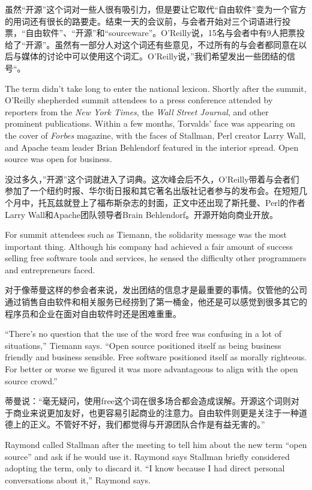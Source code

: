 \ifdefined\chs
虽然“开源”这个词对一些人很有吸引力，但是要让它取代“自由软件”变为一个官方的用词还有很长的路要走。结束一天的会议前，与会者开始对三个词语进行投票，“自由软件”、“开源”和“sourceware”。O'Reilly说，15名与会者中有9人把票投给了“开源”。虽然有一部分人对这个词还有些意见，不过所有的与会者都同意在以后与媒体的讨论中可以使用这个词汇。O'Reilly说，”我们希望发出一些团结的信号“。
\fi

\ifdefined\eng
The term didn't take long to enter the national lexicon. Shortly after the summit, O'Reilly shepherded summit attendees to a press conference attended by reporters from the \textit{New York Times}, the \textit{Wall Street Journal}, and other prominent publications. Within a few months, Torvalds' face was appearing on the cover of \textit{Forbes} magazine, with the faces of Stallman, Perl creator Larry Wall, and Apache team leader Brian Behlendorf featured in the interior spread. Open source was open for business.
\fi

\ifdefined\chs
没过多久，”开源”这个词就进入了词典。这次峰会后不久，O'Reilly带着与会者们参加了一个纽约时报、华尔街日报和其它著名出版社记者参与的发布会。在短短几个月中，托瓦兹就登上了福布斯杂志的封面，正文中还出现了斯托曼、Perl的作者Larry Wall和Apache团队领导者Brain Behlendorf。开源开始向商业开放。
\fi

\ifdefined\eng
For summit attendees such as Tiemann, the solidarity message was the most important thing. Although his company had achieved a fair amount of success selling free software tools and services, he sensed the difficulty other programmers and entrepreneurs faced.
\fi

\ifdefined\chs
对于像蒂曼这样的参会者来说，发出团结的信息才是最重要的事情。仅管他的公司通过销售自由软件和相关服务已经捞到了第一桶金，他还是可以感觉到很多其它的程序员和企业在面对自由软件时还是困难重重。
\fi

\ifdefined\eng
``There's no question that the use of the word free was confusing in a lot of situations,'' Tiemann says. ``Open source positioned itself as being business friendly and business sensible. Free software positioned itself as morally righteous. For better or worse we figured it was more advantageous to align with the open source crowd.''
\fi

\ifdefined\chs
蒂曼说：“毫无疑问，使用free这个词在很多场合都会造成误解。开源这个词则对于商业来说更加友好，也更容易引起商业的注意力。自由软件则更是关注于一种道德上的正义。不管好不好，我们都觉得与开源团队合作是有益无害的。”
\fi

\ifdefined\eng
Raymond called Stallman after the meeting to tell him about the new term ``open source'' and ask if he would use it.  Raymond says Stallman briefly considered adopting the term, only to discard it. ``I know because I had direct personal conversations about it,'' Raymond says.
\fi

